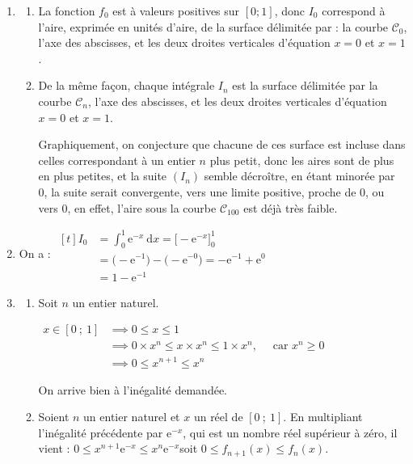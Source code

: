 \documentclass[10pt]{article}
\providecommand{\e}{{\mathrm{e}}}
\begin{document}
\begin{enumerate}
	\item \begin{enumerate}
		\item La fonction $f_0$ est à valeurs positives sur $[0 ; 1]$, donc $I_0$ correspond à l'aire, exprimée en unités d'aire, de la surface délimitée par : la courbe $\mathcal{C}_0$, l'axe des abscisses, et les deux droites verticales d'équation $x = 0$ et $x = 1$.

		\item De la même façon, chaque intégrale $I_n$ est la surface délimitée par la courbe $\mathcal{C}_n$, l'axe des abscisses, et les deux droites verticales d'équation $x = 0$ et $x = 1$.

		Graphiquement, on conjecture que chacune de ces surface est incluse dans celles correspondant à un entier $n$ plus petit, donc les aires sont de plus en plus petites, et la suite $(I_n)$ semble décroître, en étant minorée par 0, la suite serait convergente, vers une limite positive, proche de 0, ou vers 0, en effet, l'aire sous la courbe $\mathcal{C}_{100}$ est déjà très faible.
	\end{enumerate}

	\item On a : \quad
	$\displaystyle \begin{aligned}[t]
		I_0
		& = \int_{0}^{1} \e^{-x} ~\mathrm{d}x
		= \Big[-\e^{-x}\Big]_0^1\\
		& = \big(-\e^{-1}\big) - \big(-\e^{-0}\big)
		= -\e^{-1} + \e^{0}\\
		& = 1 - \e^{-1}
	\end{aligned}$

	\item
	\begin{enumerate}
		\item Soit $n$ un entier naturel.

		$\begin{aligned}
			x \in [0~;~1] &\implies 0 \leqslant x \leqslant 1\\
			&\implies 0\times x^n \leqslant x \times x^n \leqslant 1 \times x^n,\quad \text{ car } x^n \geqslant 0\\
			&\implies 0 \leqslant x^{n+1} \leqslant x^n
		\end{aligned}$

		On arrive bien à l'inégalité demandée.

		\item Soient $n$ un entier naturel et $x$ un réel de $[0~;~1]$. En multipliant l'inégalité précédente par $\e^{-x}$, qui est un nombre réel supérieur à zéro, il vient : \quad  $0 \leqslant x^{n+1} \e^{-x} \leqslant x^n \e^{-x}$\quad soit \quad$0 \leqslant f_{n+1}(x) \leqslant f_n(x)$.


\end{enumerate}
\end{enumerate}
\end{document}
